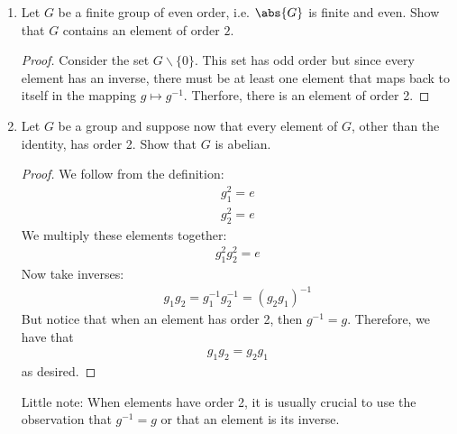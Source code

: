 \documentclass{article}
\begin{document}
\begin{enumerate}
	\item  Let $G$ be a finite group of even order, i.e. $\abs{G}$ is finite and even. Show that $G$ contains an element of order $2$.

	\begin{proof}
		Consider the set $G\backslash \{0\}$. This set has odd order but since every element has an inverse, there must be at least one element that maps back to itself in the mapping $g \mapsto g^{-1}$. Therfore, there is an element of order 2. 
	\end{proof}

	\item Let $G$ be a group and suppose now that every element of $G$, other than the identity, has order 2. Show that $G$ is abelian.

	\begin{proof}
		We follow from the definition: 
		\begin{align*}
			g_{1}^{2} = e \\
			g_{2}^{2} = e
		\end{align*}
		We multiply these elements together:
		\begin{align*}
			g_{1}^{2}g_{2}^{2} = e
		\end{align*}
		Now take inverses:
		\begin{align*}
			g_{1}g_{2} = g_{1}^{-1}g_{2}^{-1} = (g_{2}g_{1})^{-1}
		\end{align*}
	But notice that when an element has order 2, then $g^{-1} = g$. Therefore, we have that
		\begin{align*}
			g_{1}g_{2} = g_{2}g_{1}
		\end{align*}
		as desired.
	\end{proof}

	Little note: When elements have order 2, it is usually crucial to use the observation that $g^{-1} = g$ or that an element is its inverse.
\end{enumerate}
\end{document}
